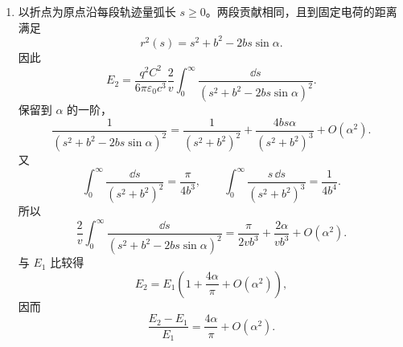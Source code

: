 \begin{question}[带电粒子受固定点电荷散射时的辐射损失]
\begin{solution}
\begin{enumerate}
  \item 以折点为原点沿每段轨迹量弧长 $s\geq0$。两段贡献相同，且到固定电荷的距离满足
  \[
    r^2(s)=s^2+b^2-2bs\sin\alpha .
  \]
  因此
  \[
    E_2=\frac{q^2C^2}{6\pi\varepsilon_0c^3}\frac{2}{v}
    \int_0^\infty\frac{\dd{s}}{(s^2+b^2-2bs\sin\alpha)^2} .
  \]
  保留到 $\alpha$ 的一阶，
  \[
    \frac1{(s^2+b^2-2bs\sin\alpha)^2}
    =\frac1{(s^2+b^2)^2}
    +\frac{4bs\alpha}{(s^2+b^2)^3}+O(\alpha^2) .
  \]
  又
  \[
    \int_0^\infty\frac{\dd{s}}{(s^2+b^2)^2}=\frac{\pi}{4b^3},
    \qquad
    \int_0^\infty\frac{s\,\dd{s}}{(s^2+b^2)^3}=\frac{1}{4b^4} .
  \]
  所以
  \[
    \frac{2}{v}\int_0^\infty\frac{\dd{s}}{(s^2+b^2-2bs\sin\alpha)^2}
    =\frac{\pi}{2vb^3}+\frac{2\alpha}{vb^3}+O(\alpha^2) .
  \]
  与 $E_1$ 比较得
  \[
    \boxed{E_2=E_1\left(1+\frac{4\alpha}{\pi}+O(\alpha^2)\right)} ,
  \]
  因而
  \[
    \boxed{\frac{E_2-E_1}{E_1}=\frac{4\alpha}{\pi}+O(\alpha^2)} .
  \]
\end{enumerate}
\end{solution}
\end{question}
